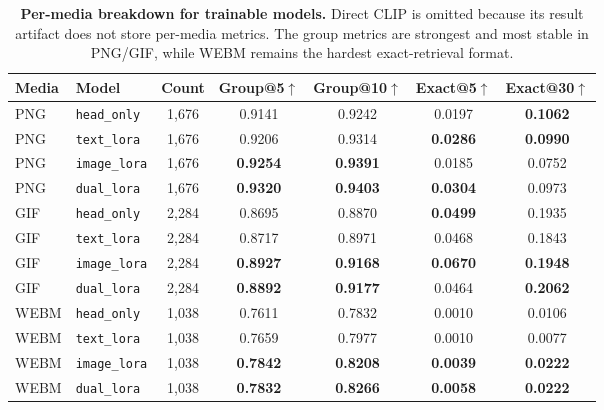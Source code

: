 \documentclass[10pt,twocolumn,letterpaper]{article}
\newcommand{\best}[1]{\textcolor{red!75!black}{\textbf{#1}}}
\newcommand{\second}[1]{\textcolor{blue!75!black}{\textbf{#1}}}
\begin{document}
\begin{table}[t]
\setlength{\tabcolsep}{5pt}
\centering
\scriptsize
\begin{tabular}{l l c c c c c}
\toprule
\textbf{Media} & \textbf{Model} & \textbf{Count}
 & \textbf{Group@5}$\uparrow$ & \textbf{Group@10}$\uparrow$
 & \textbf{Exact@5}$\uparrow$ & \textbf{Exact@30}$\uparrow$ \\
\midrule
PNG & \texttt{head\_only}  & 1{,}676 & 0.9141 & 0.9242 & 0.0197 & \best{0.1062} \\
PNG & \texttt{text\_lora}  & 1{,}676 & 0.9206 & 0.9314 & \second{0.0286} & \second{0.0990} \\
PNG & \texttt{image\_lora} & 1{,}676 & \second{0.9254} & \second{0.9391} & 0.0185 & 0.0752 \\
PNG & \texttt{dual\_lora}  & 1{,}676 & \best{0.9320} & \best{0.9403} & \best{0.0304} & 0.0973 \\
\midrule
GIF & \texttt{head\_only}  & 2{,}284 & 0.8695 & 0.8870 & \second{0.0499} & 0.1935 \\
GIF & \texttt{text\_lora}  & 2{,}284 & 0.8717 & 0.8971 & 0.0468 & 0.1843 \\
GIF & \texttt{image\_lora} & 2{,}284 & \best{0.8927} & \second{0.9168} & \best{0.0670} & \second{0.1948} \\
GIF & \texttt{dual\_lora}  & 2{,}284 & \second{0.8892} & \best{0.9177} & 0.0464 & \best{0.2062} \\
\midrule
WEBM & \texttt{head\_only}  & 1{,}038 & 0.7611 & 0.7832 & 0.0010 & 0.0106 \\
WEBM & \texttt{text\_lora}  & 1{,}038 & 0.7659 & 0.7977 & 0.0010 & 0.0077 \\
WEBM & \texttt{image\_lora} & 1{,}038 & \best{0.7842} & \second{0.8208} & \second{0.0039} & \best{0.0222} \\
WEBM & \texttt{dual\_lora}  & 1{,}038 & \second{0.7832} & \best{0.8266} & \best{0.0058} & \best{0.0222} \\
\bottomrule
\end{tabular}
\caption{\textbf{Per-media breakdown for trainable models.}
Direct CLIP is omitted because its result artifact does not store per-media
metrics. The group metrics are strongest and most stable in PNG/GIF, while
WEBM remains the hardest exact-retrieval format.}
\label{table:medium-media}
\end{table}
\end{document}
